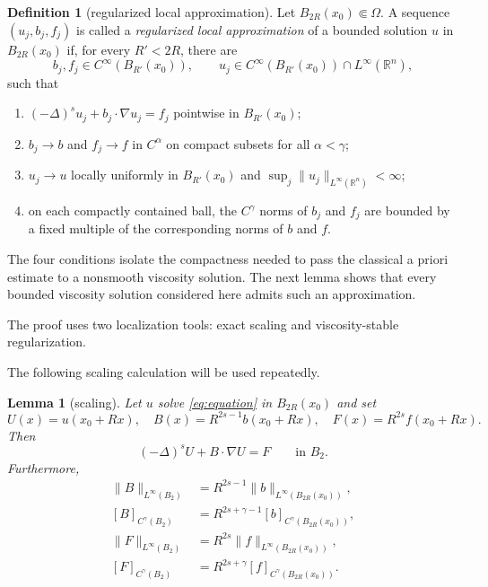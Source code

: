 \documentclass[reqno]{amsart}
\numberwithin{equation}{section}
\theoremstyle{plain}
\newtheorem{lemma}[theorem]{Lemma}
\theoremstyle{definition}
\newtheorem{definition}[theorem]{Definition}
\theoremstyle{remark}
\newcommand{\R}{\mathbb R}
\newcommand{\rev}[1]{#1}
\begin{document}
\begin{definition}[regularized local approximation]
\label{def:approximable-viscosity}
Let $B_{2R}(x_0)\Subset\Omega$.  A sequence $(u_j,b_j,f_j)$ is called a
\emph{regularized local approximation} of a bounded solution $u$ in
$B_{2R}(x_0)$ if,
for every $R'<2R$, there are
\[
 b_j,f_j\in C^\infty(B_{R'}(x_0)),\qquad
 u_j\in C^\infty(B_{R'}(x_0))\cap L^\infty(\R^n),
\]
such that
\begin{enumerate}
\item $(-\Delta)^su_j+b_j\cdot\nabla u_j=f_j$ pointwise in
$B_{R'}(x_0)$;
\item $b_j\to b$ and $f_j\to f$ in $C^\alpha$ on compact subsets for
all $\alpha<\gamma$;
\item $u_j\to u$ locally uniformly in $B_{R'}(x_0)$ and
$\sup_j\|u_j\|_{L^\infty(\R^n)}<\infty$;
\item on each compactly contained ball, the $C^\gamma$ norms of $b_j$ and
$f_j$ are bounded by a fixed multiple of the corresponding norms of $b$
and $f$.
\end{enumerate}
The four conditions isolate the compactness needed to pass the classical
a priori estimate to a nonsmooth viscosity solution.  The next lemma shows
that every bounded viscosity solution considered here admits such an
approximation.
\end{definition}

\rev{The proof uses two localization tools: exact scaling and
viscosity-stable regularization.}

The following scaling calculation will be used repeatedly.

\begin{lemma}[scaling]\label{lem:scaling}
Let $u$ solve \eqref{eq:equation} in $B_{2R}(x_0)$ and set
\begin{equation}\label{eq:rescaling}
 U(x)=u(x_0+Rx),\quad
 B(x)=R^{2s-1}b(x_0+Rx),\quad
 F(x)=R^{2s}f(x_0+Rx).
\end{equation}
Then
\[
 (-\Delta)^sU+B\cdot\nabla U=F\qquad\text{in }B_2.
\]
Furthermore,
\begin{align*}
 \|B\|_{L^\infty(B_2)}
 &=R^{2s-1}\|b\|_{L^\infty(B_{2R}(x_0))},\\
 [B]_{C^\gamma(B_2)}
 &=R^{2s+\gamma-1}[b]_{C^\gamma(B_{2R}(x_0))},\\
 \|F\|_{L^\infty(B_2)}
 &=R^{2s}\|f\|_{L^\infty(B_{2R}(x_0))},\\
 [F]_{C^\gamma(B_2)}
 &=R^{2s+\gamma}[f]_{C^\gamma(B_{2R}(x_0))}.
\end{align*}
\end{lemma}
\end{document}
